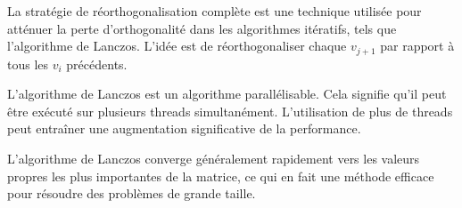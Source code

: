 \documentclass[11pt,french]{article}
\begin{document}
    La stratégie de réorthogonalisation complète est une technique utilisée pour atténuer la perte d'orthogonalité dans les algorithmes itératifs, tels que l'algorithme de Lanczos. L'idée est de réorthogonaliser chaque $v_{j+1}$ par rapport à tous les $v_i$ précédents.

    L'algorithme de Lanczos est un algorithme parallélisable. Cela signifie qu'il peut être exécuté sur plusieurs threads simultanément. L'utilisation de plus de threads peut entraîner une augmentation significative de la performance.
     
     L'algorithme de Lanczos converge généralement rapidement vers les valeurs propres les plus importantes de la matrice, ce qui en fait une méthode efficace pour résoudre des problèmes de grande taille.
\end{document}
